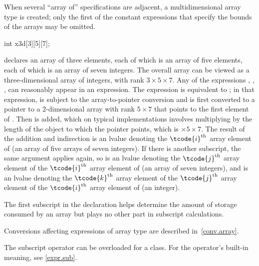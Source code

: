 \pnum
{}%
\begin{note}
When several ``array of'' specifications are adjacent,
a multidimensional array type is created;
only the first of the constant expressions
that specify the bounds of the arrays may be omitted.
\begin{example}
\begin{codeblock}
int x3d[3][5][7];
\end{codeblock}
declares an array of three elements,
each of which is an array of five elements,
each of which is an array of seven integers.
The overall array can be viewed as a
three-dimensional array of integers,
with rank $3 \times 5 \times 7$.
Any of the expressions
,
,
,
can reasonably appear in an expression.
The expression
is equivalent to
;
in that expression,
is subject to the array-to-pointer conversion
and is first converted to
a pointer to a 2-dimensional
array with rank
$5 \times 7$
that points to the first element of .
Then  is added,
which on typical implementations involves multiplying
 by the
length of the object to which the pointer points,
which is $ \times 5 \times 7$.
The result of the addition and indirection is
an lvalue denoting
the $\tcode{i}^\text{th}$ array element of
(an array of five arrays of seven integers).
If there is another subscript,
the same argument applies again, so
 is
an lvalue denoting
the $\tcode{j}^\text{th}$ array element of
the $\tcode{i}^\text{th}$ array element of
(an array of seven integers), and
 is
an lvalue denoting
the $\tcode{k}^\text{th}$ array element of
the $\tcode{j}^\text{th}$ array element of
the $\tcode{i}^\text{th}$ array element of
(an integer).
\end{example}
The first subscript in the declaration helps determine
the amount of storage consumed by an array
but plays no other part in subscript calculations.
\end{note}

\pnum
\begin{note}
Conversions affecting expressions of array type are described in~\ref{conv.array}.
\end{note}

\pnum
\begin{note}
The subscript operator can be overloaded for a class.
For the operator's built-in meaning, see \ref{expr.sub}.
\end{note}

